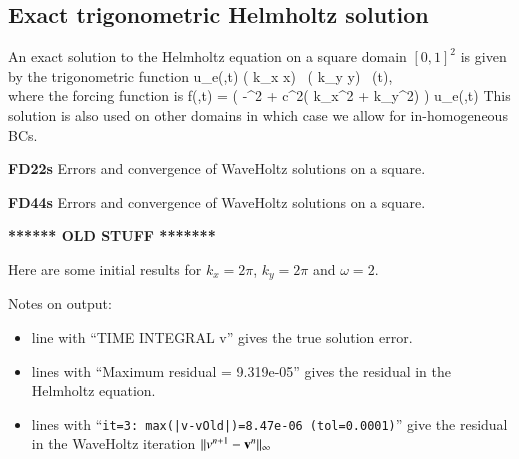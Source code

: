 \subsection{Exact trigonometric Helmholtz solution} \label{sec:trigHelmholtz}

An exact solution to the Helmholtz equation on a square domain $[0,1]^2$ is
given by the trigonometric function 
\bas
   u_e(\xv,t) \eqdef \sin( k_x x) \, \sin( k_y y) \, \cos(\omega t), \\
\eas
where the forcing function is
\bas
  f(\xv,t) = \Big( -\omega^2 + c^2( k_x^2 + k_y^2) \Big) u_e(\xv,t)
\eas
This solution is also used on other domains in which case we allow for in-homogeneous BCs.

\mni
\textbf{FD22s} Errors and convergence of WaveHoltz solutions on a square.


\mni
\textbf{FD44s} Errors and convergence of WaveHoltz solutions on a square.



\clearpage
\textbf{****** OLD STUFF *******}

Here are some initial results for $k_x=2\pi$, $k_y=2\pi$ and $\omega=2$. 

\noindent Notes on output: 
\begin{itemize}
  \item line with ``TIME INTEGRAL v'' gives the true solution error.
  \item lines with ``Maximum residual = 9.319e-05'' gives the residual in the Helmholtz equation.
  \item lines with ``\texttt{it=3:  max(|v-vOld|)=8.47e-06 (tol=0.0001)}'' give the residual in the
        WaveHoltz iteration $\| v^{n+1} - \mathbf{ v}^{n} \|_\infty$
\end{itemize}


